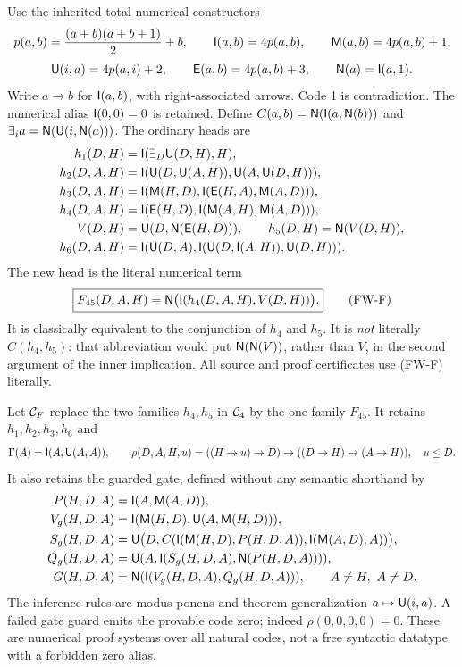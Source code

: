 Use the inherited total numerical constructors
\[
 p(a,b)=\frac{(a+b)(a+b+1)}2+b,\qquad
 \mathsf I(a,b)=4p(a,b),\qquad \mathsf M(a,b)=4p(a,b)+1,
\]
\[
 \mathsf U(i,a)=4p(a,i)+2,\qquad \mathsf E(a,b)=4p(a,b)+3,
 \qquad \mathsf N(a)=\mathsf I(a,1).
\]
Write $a\to b$ for $\mathsf I(a,b)$, with right-associated arrows.  Code 1
is contradiction.  The numerical alias $\mathsf I(0,0)=0$ is retained.
Define $C(a,b)=\mathsf N(\mathsf I(a,\mathsf N(b)))$ and
$\exists_i a=\mathsf N(\mathsf U(i,\mathsf N(a)))$.  The ordinary heads are
\begin{align*}
 h_1(D,H)&=\mathsf I(\exists_D\mathsf U(D,H),H),\\
 h_2(D,A,H)&=\mathsf I(\mathsf U(D,\mathsf U(A,H)),\mathsf U(A,\mathsf U(D,H))),\\
 h_3(D,A,H)&=\mathsf I(\mathsf M(H,D),\mathsf I(\mathsf E(H,A),\mathsf M(A,D))),\\
 h_4(D,A,H)&=\mathsf I(\mathsf E(H,D),\mathsf I(\mathsf M(A,H),\mathsf M(A,D))),\\
 V(D,H)&=\mathsf U(D,\mathsf N(\mathsf E(H,D))),\qquad h_5(D,H)=\mathsf N(V(D,H)),\\
 h_6(D,A,H)&=\mathsf I(\mathsf U(D,A),
                   \mathsf I(\mathsf U(D,\mathsf I(A,H)),\mathsf U(D,H))).
\end{align*}
The new head is the literal numerical term
\[
 \boxed{F_{45}(D,A,H)=
       \mathsf N\bigl(\mathsf I(h_4(D,A,H),V(D,H))\bigr).}       \tag{FW-F}
\]
It is classically equivalent to the conjunction of $h_4$ and $h_5$.
It is \emph{not} literally $C(h_4,h_5)$: that abbreviation would put
$\mathsf N(\mathsf N(V))$, rather than $V$, in the second argument of the inner
implication.  All source and proof certificates use (FW-F) literally.

Let $\mathcal C_F$ replace the two families $h_4,h_5$ in $\mathcal C_4$ by the one
family $F_{45}$.  It retains $h_1,h_2,h_3,h_6$ and
\[
 \Gamma(A)=\mathsf I(A,\mathsf U(A,A)),\qquad
 \rho(D,A,H,u)=((H\to u)\to D)\to((D\to H)\to(A\to H)),
 \quad u\le D.
\]
It also retains the guarded gate, defined without any semantic shorthand by
\begin{align*}
 P(H,D,A)&=\mathsf I(A,\mathsf M(A,D)),\\
 V_g(H,D,A)&=\mathsf I(\mathsf M(H,D),\mathsf U(A,\mathsf M(H,D))),\\
 S_g(H,D,A)&=\mathsf U\bigl(D,C(\mathsf I(\mathsf M(H,D),P(H,D,A)),
                              \mathsf I(\mathsf M(A,D),A))\bigr),\\
 Q_g(H,D,A)&=\mathsf U(A,\mathsf I(S_g(H,D,A),\mathsf N(P(H,D,A)))),\\
 G(H,D,A)&=\mathsf N(\mathsf I(V_g(H,D,A),Q_g(H,D,A))),
                  \qquad A\ne H,\ A\ne D.
\end{align*}
The inference rules are modus ponens and theorem generalization
$a\mapsto\mathsf U(i,a)$.  A failed gate guard emits the provable code zero;
indeed $\rho(0,0,0,0)=0$.  These are numerical proof systems over all
natural codes, not a free syntactic datatype with a forbidden zero alias.


